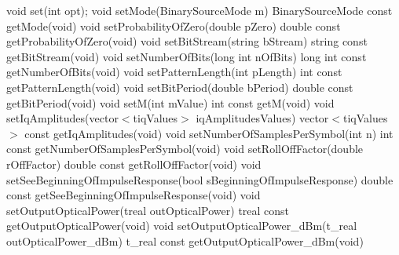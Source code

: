 void set(int opt);
\bigbreak
void setMode(BinarySourceMode m)
\bigbreak
BinarySourceMode const getMode(void)
\bigbreak
void setProbabilityOfZero(double pZero)
\bigbreak
double const getProbabilityOfZero(void)
\bigbreak
void setBitStream(string bStream)
\bigbreak
string const getBitStream(void)
\bigbreak
void setNumberOfBits(long int nOfBits)
\bigbreak
long int const getNumberOfBits(void)
\bigbreak
void setPatternLength(int pLength)
\bigbreak
int const getPatternLength(void)
\bigbreak
void setBitPeriod(double bPeriod)
\bigbreak
double const getBitPeriod(void)
\bigbreak
void setM(int mValue)
int const getM(void)
\bigbreak
void setIqAmplitudes(vector$<$t\textunderscore iqValues$>$ iqAmplitudesValues)
\bigbreak
vector$<$t\textunderscore iqValues$>$ const getIqAmplitudes(void)
\bigbreak
void setNumberOfSamplesPerSymbol(int n)
\bigbreak
int const getNumberOfSamplesPerSymbol(void)
\bigbreak
void setRollOffFactor(double rOffFactor)
\bigbreak
double const getRollOffFactor(void)
\bigbreak
void setSeeBeginningOfImpulseResponse(bool sBeginningOfImpulseResponse)
\bigbreak
double const getSeeBeginningOfImpulseResponse(void)
\bigbreak
void setOutputOpticalPower(t\textunderscore real outOpticalPower)
\bigbreak
t\textunderscore real const getOutputOpticalPower(void)
\bigbreak
void setOutputOpticalPower\_dBm(t\_real outOpticalPower\_dBm)
\bigbreak
t\_real const getOutputOpticalPower\_dBm(void)
\pagebreak


